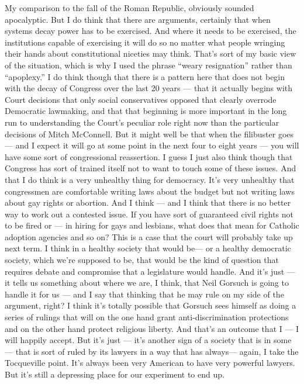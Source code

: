My comparison to the fall of the Roman Republic, obviously sounded
apocalyptic. But I do think that there are arguments, certainly that
when systems decay power has to be exercised. And where it needs to be
exercised, the institutions capable of exercising it will do so no
matter what people wringing their hands about constitutional niceties
may think. That's sort of my basic view of the situation, which is why I
used the phrase ``weary resignation'' rather than ``apoplexy.'' I do
think though that there is a pattern here that does not begin with the
decay of Congress over the last 20 years --- that it actually begins
with Court decisions that only social conservatives opposed that clearly
overrode Democratic lawmaking, and that that beginning is more important
in the long run to understanding the Court's peculiar role right now
than the particular decisions of Mitch McConnell. But it might well be
that when the filibuster goes --- and I expect it will go at some point
in the next four to eight years --- you will have some sort of
congressional reassertion. I guess I just also think though that
Congress has sort of trained itself not to want to touch some of these
issues. And that I do think is a very unhealthy thing for democracy.
It's very unhealthy that congressmen are comfortable writing laws about
the budget but not writing laws about gay rights or abortion. And I
think --- and I think that there is no better way to work out a
contested issue. If you have sort of guaranteed civil rights not to be
fired or --- in hiring for gays and lesbians, what does that mean for
Catholic adoption agencies and so on? This is a case that the court will
probably take up next term. I think in a healthy society that would
be--- or a healthy democratic society, which we're supposed to be, that
would be the kind of question that requires debate and compromise that a
legislature would handle. And it's just --- it tells us something about
where we are, I think, that Neil Gorsuch is going to handle it for us
--- and I say that thinking that he may rule on my side of the argument,
right? I think it's totally possible that Gorsuch sees himself as doing
a series of rulings that will on the one hand grant anti-discrimination
protections and on the other hand protect religious liberty. And that's
an outcome that I --- I will happily accept. But it's just --- it's
another sign of a society that is in some--- that is sort of ruled by
its lawyers in a way that has always--- again, I take the Tocqueville
point. It's always been very American to have very powerful lawyers. But
it's still a depressing place for our experiment to end up.

